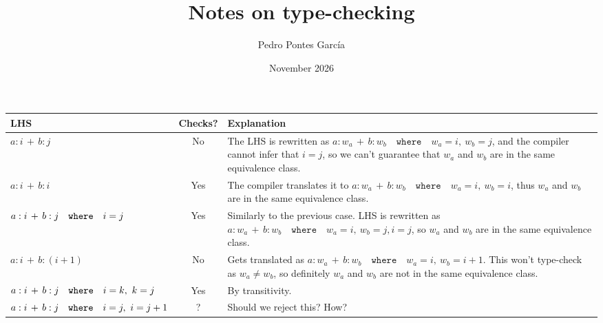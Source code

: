 \documentclass[letterpaper]{article}
\title{Notes on type-checking}
\author{Pedro Pontes García}
\date{November 2026}
\newcommand{\p}{\,+\,}
\begin{document}
\maketitle

\begin{table}[ht]
\centering
\renewcommand{\arraystretch}{1.8}
\setlength{\tabcolsep}{12pt}
\begin{tabular}{L{4cm}cp{8.5cm}}
    \textbf{LHS} & \textbf{Checks?} & \textbf{Explanation}\\
    \toprule
    $a:i \p b:j$ & No & The LHS is rewritten as $a:w_a \p b:w_b\quad\mathtt{where}\quad w_a=i,\  w_b=j$, and the compiler cannot infer that $i=j$, so we can't guarantee that $w_a$ and $w_b$ are in the same equivalence class. \\
    $a:i \p b:i$ & Yes & The compiler translates it to $a:w_a \p b:w_b\quad\mathtt{where}\quad w_a = i,\  w_b = i$, thus $w_a$ and $w_b$ are in the same equivalence class. \\
    $a:i \p b:j\break\quad\mathtt{where}\quad i = j$ & Yes & Similarly to the previous case. LHS is rewritten as $a:w_a \p b:w_b\quad\mathtt{where}\quad w_a = i,\  w_b = j, i=j$, so $w_a$ and $w_b$ are in the same equivalence class. \\
    $a:i \p b:(i+1)$ & No & Gets translated as $a:w_a \p b:w_b\quad\mathtt{where}\quad w_a = i,\  w_b = i+1$. This won't type-check as $w_a \neq w_b$, so definitely $w_a$ and $w_b$ are not in the same equivalence class. \\
    $a:i \p b:j \break\quad\mathtt{where}\quad i = k,\ k = j$ & Yes & By transitivity. \\
    $a:i \p b:j \break\quad\mathtt{where}\quad i = j,\ i = j+1$ & ? & Should we reject this? How? \\
    \bottomrule
\end{tabular}
\end{table}
\end{document}
